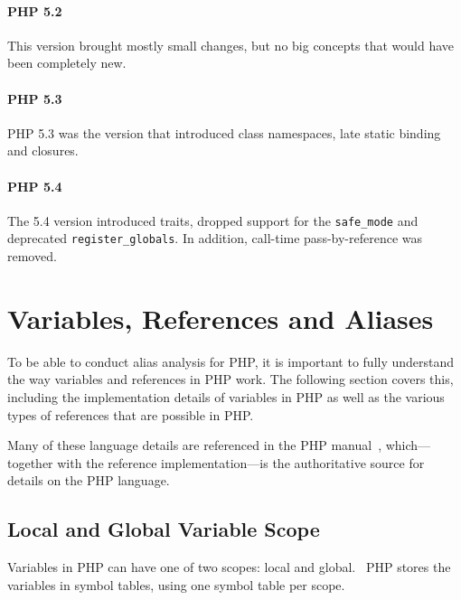 \paragraph*{PHP 5.2}
This version brought mostly small changes, but no big concepts that would have been completely new.


\paragraph*{PHP 5.3}
PHP 5.3 was the version that introduced class namespaces, late static binding and closures.


\paragraph*{PHP 5.4}
The 5.4 version introduced traits, dropped support for the \texttt{safe\_mode} and deprecated \texttt{register\_globals}. In addition, call-time pass-by-reference was removed.


\section{Variables, References and Aliases}
\label{php-variables}

To be able to conduct alias analysis for PHP, it is important to fully understand the way variables and references in PHP work. The following section covers this, including the implementation details of variables in PHP as well as the various types of references that are possible in PHP.

Many of these language details are referenced in the PHP manual~\cite{php-manual}, which---together with the reference implementation---is the authoritative source for details on the PHP language.


\subsection{Local and Global Variable Scope}
\label{sec:variable-scope}

Variables in PHP can have one of two scopes: local and global.~\cite{php-manual-scope} PHP stores the variables in symbol tables, using one symbol table per scope.~\cite{php-manual-reference-counting}

